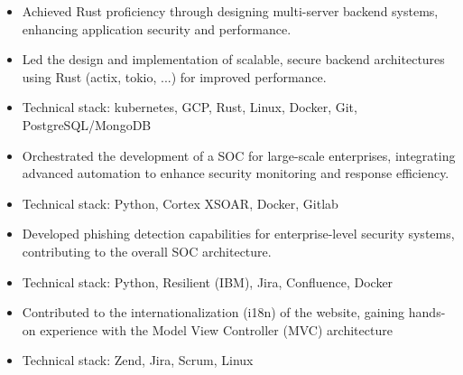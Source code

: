 \documentclass[10pt,a4paper,ragged2e,withhyper]{altacv}
\begin{document}
\begin{paracol}{2}

\begin{itemize}
  \item Achieved Rust proficiency through designing multi-server backend systems, enhancing application security and performance.
  \item Led the design and implementation of scalable, secure backend architectures using Rust (actix, tokio, ...) for improved performance.
  \item Technical stack: kubernetes, GCP, Rust, Linux, Docker, Git, PostgreSQL/MongoDB
\end{itemize}

\divider

\begin{itemize}
  \item Orchestrated the development of a SOC for large-scale enterprises, integrating advanced automation to enhance security monitoring and response efficiency. %
  \item Technical stack: Python, Cortex XSOAR, Docker, Gitlab
\end{itemize}

\divider

\begin{itemize}
  \item Developed phishing detection capabilities for enterprise-level security systems, contributing to the overall SOC architecture.
  \item Technical stack: Python, Resilient (IBM), Jira, Confluence, Docker
\end{itemize}

\divider

\begin{itemize}
  \item Contributed to the internationalization (i18n) of the website, gaining hands-on experience with the Model View Controller (MVC) architecture
  \item Technical stack: Zend, Jira, Scrum, Linux
\end{itemize}


\end{paracol}
\end{document}
